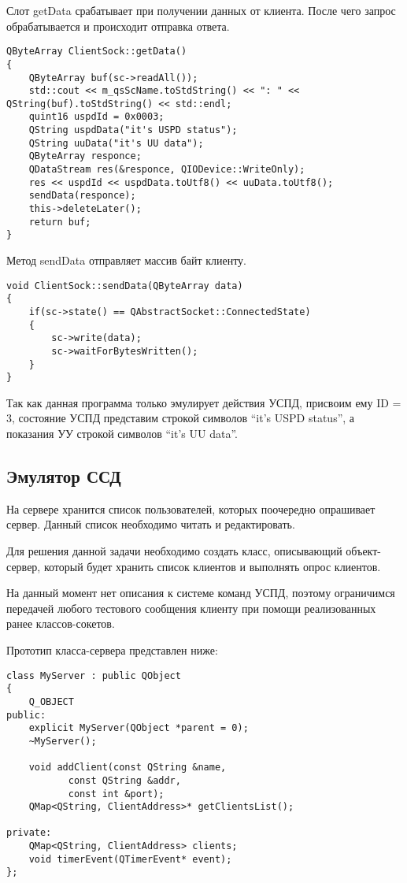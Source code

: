 Слот getData срабатывает при получении данных от клиента. После чего запрос обрабатывается и происходит отправка ответа.

\begin{lstlisting}
QByteArray ClientSock::getData()
{
    QByteArray buf(sc->readAll());
    std::cout << m_qsScName.toStdString() << ": " << QString(buf).toStdString() << std::endl;
    quint16 uspdId = 0x0003;
    QString uspdData("it's USPD status");
    QString uuData("it's UU data");
    QByteArray responce;
    QDataStream res(&responce, QIODevice::WriteOnly);
    res << uspdId << uspdData.toUtf8() << uuData.toUtf8();
    sendData(responce);
    this->deleteLater();
    return buf;
}
\end{lstlisting}

Метод sendData отправляет массив байт клиенту.

\begin{lstlisting}
void ClientSock::sendData(QByteArray data)
{
    if(sc->state() == QAbstractSocket::ConnectedState)
    {
        sc->write(data);
        sc->waitForBytesWritten();
    }
} 
\end{lstlisting}

Так как данная программа только эмулирует действия УСПД, присвоим ему ID = 3, состояние УСПД представим строкой символов ``it's USPD status'', а показания УУ строкой символов ``it's UU data''.

\subsection{Эмулятор ССД}

На сервере хранится список пользователей, которых поочередно опрашивает сервер. Данный список необходимо читать и редактировать.

Для решения данной задачи необходимо создать класс, описывающий объект-сервер, который будет хранить список клиентов и выполнять опрос клиентов.

На данный момент нет описания к системе команд УСПД, поэтому ограничимся передачей любого тестового сообщения клиенту при помощи реализованных ранее классов-сокетов.

Прототип класса-сервера представлен ниже:

\begin{lstlisting}
class MyServer : public QObject
{
    Q_OBJECT
public:
    explicit MyServer(QObject *parent = 0);
    ~MyServer();

    void addClient(const QString &name, 
		   const QString &addr, 
		   const int &port);
    QMap<QString, ClientAddress>* getClientsList();

private:
    QMap<QString, ClientAddress> clients;
    void timerEvent(QTimerEvent* event);
};
\end{lstlisting}

